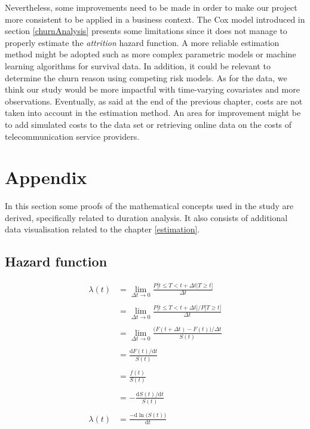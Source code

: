 \documentclass[
]{book}
\begin{document}
Nevertheless, some improvements need to be made in order to make our project more consistent to be applied in a business context. The Cox model introduced in section \ref{churnAnalysis} presents some limitations since it does not manage to properly estimate the \emph{attrition} hazard function. A more reliable estimation method might be adopted such as more complex parametric models or machine learning algorithms for survival data. In addition, it could be relevant to determine the churn reason using competing risk models. As for the data, we think our study would be more impactful with time-varying covariates and more observations. Eventually, as said at the end of the previous chapter, costs are not taken into account in the estimation method. An area for improvement might be to add simulated costs to the data set or retrieving online data on the costs of telecommunication service providers.

\hypertarget{appendix}{%
\chapter*{Appendix}\label{appendix}}

In this section some proofs of the mathematical concepts used in the study are derived, specifically related to duration analysis. It also consists of additional data visualisation related to the chapter \ref{estimation}.

\hypertarget{hazard-function}{%
\section*{Hazard function}\label{hazard-function}}

\begin{equation}    
  \begin{aligned}
  \lambda(t) & = \lim_{\Delta t \to 0} \frac{P\big[t \leq T < t + \Delta t | T \geq t \big]}{\Delta t} \\\\
  & = \lim_{\Delta t \to 0} \frac{P\big[t \leq T < t + \Delta t \big] / P\big[T \geq t  \big]}{\Delta t} \\\\
  & = \lim_{\Delta t \to 0} \frac{\big(F(t+\Delta t)-F(t)\big) / \Delta t}{S(t)} \\\\
  & = \frac{\text{d} F(t) / \text{d} t}{S(t)} \\\\
  & = \frac{f(t)}{S(t)} \\\\
  & = - \frac{\text{d}S(t) / \text{d} t}{S(t)} \\\\
  \lambda(t) & = \frac{-\text{d} \ln \big(S(t)\big)}{\text{d} t}
  \end{aligned}
  \label{eq:hazfunproof}
\end{equation}
\end{document}
